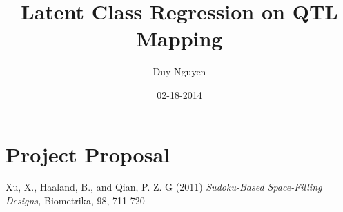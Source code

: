 \documentclass{article}
\begin{document}
\title{Latent Class Regression on QTL Mapping}         %
\author{Duy Nguyen}        %
\date{02-18-2014}          %
\maketitle
\section*{Project Proposal}

\begin{thebibliography}{99}
 		Xu, X., Haaland, B., and Qian, P. Z. G (2011)
 		\emph{Sudoku-Based Space-Filling Designs,} Biometrika, 98, 711-720
\end{thebibliography}
\end{document}
